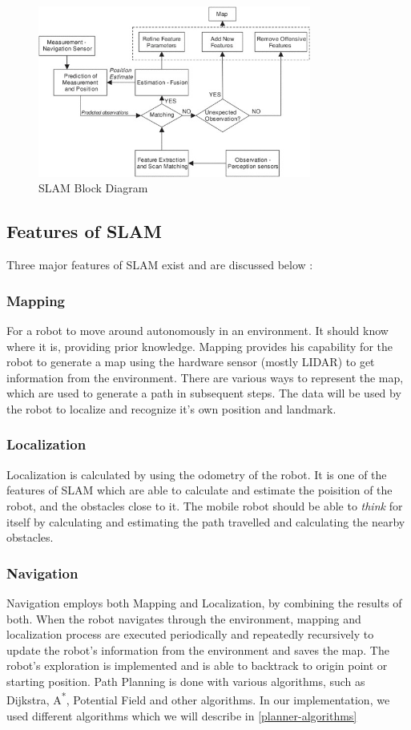 \begin{figure}[th]
    \centering
    \includegraphics[width=0.8\textwidth]{Figures/SLAM_Block_Final.jpeg}
    \decoRule
    \caption[]{SLAM Block Diagram \cite{7081165}}
    \label{fig:SLAMBlockDiagram}
\end{figure}

\subsection{Features of SLAM}
Three major features of SLAM exist and are discussed below : 
\subsubsection{Mapping}
For a robot to move around autonomously in an environment. It should know where it is, providing prior knowledge. Mapping provides his capability for the robot to generate a map using the hardware sensor (mostly LIDAR) to get information from the environment.
There are various ways to represent the map, which are used to generate a path in subsequent steps. The data will be used by the robot to localize and recognize it's own position and landmark.
\subsubsection{Localization}
Localization is calculated by using the odometry of the robot. It is one of the features of SLAM which are able to calculate and estimate the poisition of the robot, and the obstacles close to it.
The mobile robot should be able to \textit{think} for itself by calculating and estimating the path travelled and calculating the nearby obstacles. 
\subsubsection{Navigation}
Navigation employs both Mapping and Localization, by combining the results of both. When the robot navigates through the environment, mapping and localization process are 
executed periodically and repeatedly recursively to update the robot's information from the environment and saves the map. The robot's exploration is implemented and is able to backtrack to origin point 
or starting position. Path Planning is done with various algorithms, such as Dijkstra, A\textsuperscript{*}, Potential Field and other algorithms. In our implementation, we used different algorithms which we will describe in \ref{planner-algorithms}

